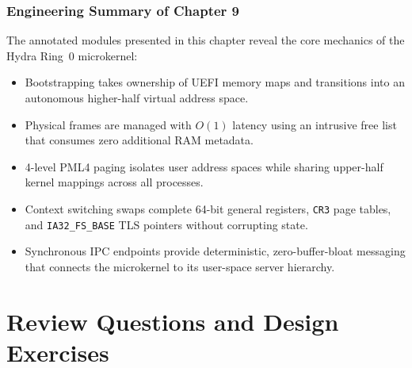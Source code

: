 \subsubsection*{Engineering Summary of Chapter 9}
The annotated modules presented in this chapter reveal the core mechanics of the Hydra Ring~0 microkernel:
\begin{itemize}
    \item Bootstrapping takes ownership of UEFI memory maps and transitions into an autonomous higher-half virtual address space.
    \item Physical frames are managed with $O(1)$ latency using an intrusive free list that consumes zero additional RAM metadata.
    \item 4-level PML4 paging isolates user address spaces while sharing upper-half kernel mappings across all processes.
    \item Context switching swaps complete 64-bit general registers, \texttt{CR3} page tables, and \texttt{IA32\_FS\_BASE} TLS pointers without corrupting state.
    \item Synchronous IPC endpoints provide deterministic, zero-buffer-bloat messaging that connects the microkernel to its user-space server hierarchy.
\end{itemize}

\section{Review Questions and Design Exercises}
\label{sec:core_source_exercises}

